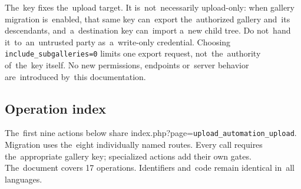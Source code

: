 \documentclass[11pt,a4paper]{article}
\newcommand{\codeword}[1]{\nolinkurl{#1}}
\begin{document}
The~key fixes the~upload target. It is~not~necessarily upload-only: when gallery migration
is~enabled, that same key can~export the~authorized gallery and~its descendants,
and~a~destination key can~import a~new child tree. Do not~hand it~to~an~untrusted party
as~a~write-only credential. Choosing \codeword{include_subgalleries=0} limits one export
request, not~the~authority of~the~key itself. No new permissions, endpoints or~server
behavior are~introduced by~this documentation.

\subsection{\texorpdfstring{Operation index}{Operation index}}

\label{api352:operation-index}

The~first nine actions below share index.php?page=\codeword{upload_automation_upload}.
Migration uses the~eight individually named routes. Every call requires the~appropriate
gallery key; specialized actions add their own gates. The~document covers 17 operations.
Identifiers and~code remain identical in~all languages.
\end{document}
